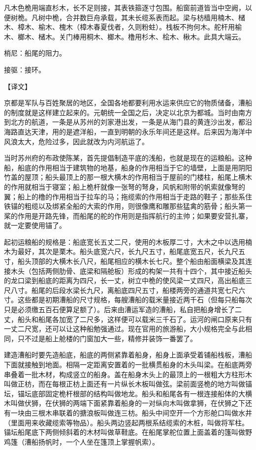 \documentclass[12pt,UTF8]{ctexbook}
\begin{document}
凡木色桅用端直杉木，长不足则接，其表铁箍逐寸包围。船窗前道皆当中空阙，以便树桅。凡树中桅，合并数巨舟承载，其未长缆系表而起。梁与枋樯用楠木、槠木、樟木、榆木、槐木（樟木春夏伐者，久则粉蛀）。栈板不拘何木。舵杆用榆木、榔木、槠木。关门棒用桐木、榔木。橹用杉木、桧木、楸木。此具大端云。

梢尼：船尾的阻力。

接驱：接环。

【译文】

京都是军队与百姓聚居的地区，全国各地都要利用水运来供应它的物质储备，漕船的制度就是这样建立起来的。元朝统一全国之后，决定以北京为都城。当时由南方到北方的航道，一条是从苏州的刘家港出发，一条是从海门县的黄连沙出发，都沿海路直达天津，用的是遮洋船，一直到明朝的永乐年间还是这样。后来因为海洋中风浪太大，危险过多，因此就改为内河航运了。

当时苏州府的布政使陈某，首先提倡制造平底的浅船，也就是现在的运粮船。这种船，船底的作用相当于建筑物的地基，船身的作用相当于它的墙壁，上面是用阴阳竹盖的屋顶；船头最顶上的那一根大横木的作用相当于屋前的门楼柱，船尾上横木的作用就相当于寝室；船上桅杆就像一张弩的弩身，风帆和附带的帆索就像弩的翼；船上的橹的作用相当于拉车的马；拖缆索的作用相当于走路的鞋子；那些系住铁锚的粗缆以及绑紧全船的大索的作用，则很像鹰和雕那些猛禽的筋骨；船头第一桨的作用是开路先锋，而船尾的舵的作用则是指挥航行的主帅；如果要安营扎寨，就一定要使用锚了。

起初运粮船的规格是：船底宽长五丈二尺，使用的木板厚二寸，大木之中以选用楠木为最好，其次是栗木。船头底宽六尺，长九尺五寸，船尾底宽五尺，长九尺五寸，船头顶部的大横木长八尺，船尾相应的横木长七尺。整个船由船面横梁及其连接木头（包括两侧肋骨、底梁和隔舱板）形成的构架一共有十四个，其中接近船头的龙口梁到船底的距离为四尺，长一丈，树立中桅的使风梁一丈四尺，高出船底三尺八寸。船尾的后段水梁长九尺，离船底四尺五寸，船楼两旁的通道共宽七尺六寸。这些都是初期漕船的尺寸规格，每艘漕船的载米量接近两千石（但每只船每次只是必须缴五百石便算足额了）。后来由漕运军造的漕船，私自把船身增长了二丈，船头和船尾各加宽了二尺多，这样便可以载米三千石了。运河的闸口原来只有一丈二尺宽，还可以让这种船勉强通过。现在官用的旅游船，大小规格完全与此相同，只不过是船上舱楼的门窗加大一些，精修并装饰一番罢了。

建造漕船时要先造船底，船底的两侧紧靠着船身，船身上面承受着铺船栈板，漕船下面就接触到地面。相隔一定距离安置着的一批横贯船身的木头叫梁。在船底两旁串叠着一批木材，构成竖立的船身。盖在船身木头上的最顶上的一根粗大方柱形木叫做正枋，而在每根正枋上面还有一片纵长木板叫做弦。梁前面竖桅的地方叫做锚坛，锚坛底部固定桅杆根部的结构叫做地龙。船头和船尾各有一根连接船体的大横木叫做伏狮，在伏狮的两端下面紧靠着船身的一对纵向木叫做拿狮，在伏狮之下还有一块由三根木串联着的搪浪板叫做连三枋。船头中间空开一个方形舱口叫做水井（里面用来收藏缆索等物品）。船头两边竖起两根系结缆索的木桩，叫做将军柱。锚坛船尾底下两侧倾斜着的木材叫做草鞋底。在船尾掌舵位置上面盖着的篷叫做野鸡篷（漕船扬帆时，一个人坐在篷顶上掌握帆索）。
\end{document}
